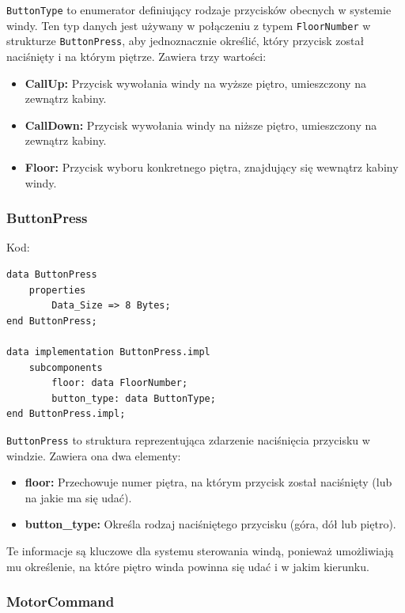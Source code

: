 \documentclass{article}
\begin{document}
    \texttt{ButtonType} to enumerator definiujący rodzaje przycisków obecnych w systemie windy. Ten typ danych jest używany w połączeniu z typem \texttt{FloorNumber} w strukturze \texttt{ButtonPress}, aby jednoznacznie określić, który przycisk został naciśnięty i na którym piętrze. Zawiera trzy wartości:

    \begin{itemize}
        \item \textbf{CallUp:} Przycisk wywołania windy na wyższe piętro, umieszczony na zewnątrz kabiny.
        \item \textbf{CallDown:} Przycisk wywołania windy na niższe piętro, umieszczony na zewnątrz kabiny.
        \item \textbf{Floor:} Przycisk wyboru konkretnego piętra, znajdujący się wewnątrz kabiny windy.
    \end{itemize}


    \subsubsection{ButtonPress}

    Kod:
    
    \begin{lstlisting}[basicstyle=\ttfamily, keywordstyle=\bfseries]
data ButtonPress
    properties
        Data_Size => 8 Bytes; 
end ButtonPress;

data implementation ButtonPress.impl
    subcomponents
        floor: data FloorNumber;
        button_type: data ButtonType;
end ButtonPress.impl;
    \end{lstlisting}

    \texttt{ButtonPress} to struktura reprezentująca zdarzenie naciśnięcia przycisku w windzie. Zawiera ona dwa elementy:

    \begin{itemize}
        \item \textbf{floor:} Przechowuje numer piętra, na którym przycisk został naciśnięty (lub na jakie ma się udać).
        \item \textbf{button\_type:} Określa rodzaj naciśniętego przycisku (góra, dół lub piętro).
    \end{itemize}

    Te informacje są kluczowe dla systemu sterowania windą, ponieważ umożliwiają mu określenie, na które piętro winda powinna się udać i w jakim kierunku.


    \newpage
    
    \subsubsection{MotorCommand}
\end{document}
